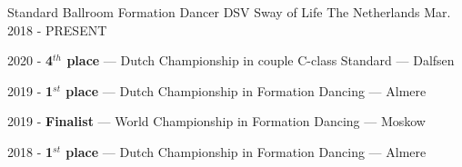 
\begin{cventries}




  \cventry
    {Standard Ballroom Formation Dancer} %
    {DSV Sway of Life} %
    {The Netherlands} %
    {Mar. 2018 - PRESENT} %
    {
      \begin{cvitems} %
        \item {2020 - \textbf{4$^{th}$ place} --- Dutch Championship in couple C-class Standard --- Dalfsen}
        \item {2019 - \textbf{1$^{st}$ place} --- Dutch Championship in Formation Dancing --- Almere}
        \item {2019 - \textbf{Finalist} --- World Championship in Formation Dancing --- Moskow}
        \item {2018 - \textbf{1$^{st}$ place} --- Dutch Championship in Formation Dancing --- Almere}
      \end{cvitems}
    }


\end{cventries}
